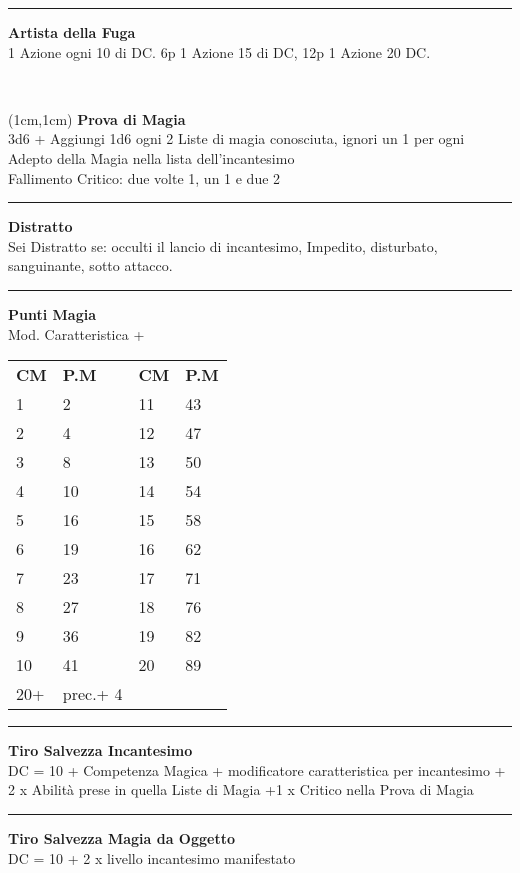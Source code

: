 \documentclass[a4paper,12 pt,openany]{book}
\newcommand{\riga}{\rule{\textwidth}{0.4pt}}
\begin{document}
\begin{textblock*}{7cm}
\riga

\textbf{Artista della Fuga}\\
1 Azione ogni 10 di DC. 6p 1 Azione 15 di DC, 12p 1 Azione 20 DC.

\end{textblock*}

~\newpage

\begin{textblock*}{5cm}(1cm,1cm) %
\textbf{Prova di Magia}\\
3d6 + Aggiungi 1d6 ogni 2 Liste di magia conosciuta, ignori un 1 per ogni Adepto della Magia nella lista dell'incantesimo\\
Fallimento Critico: due volte 1, un 1 e due 2\\


\riga

\textbf{Distratto}\\
Sei Distratto se: occulti il lancio di incantesimo, Impedito, disturbato, sanguinante, sotto attacco.\\

\riga

\textbf{Punti Magia}\\
Mod. Caratteristica + \\

\begin{tabular}{ll|ll}
\textbf{CM} & \textbf{P.M}&	\textbf{CM} & \textbf{P.M}\\
	1&	2 	&11&43\\
2&	4	&12&47\\
3&	8	&13&50\\
4&	10	&14&54\\
5&	16	&15&58\\
6&	19	&16&62\\
7&	23	&17&71\\
8&	27	&18&76\\
9&	36	&19&82\\
10&	41	&20&89\\
20+&prec.+ 4&&\\
\end{tabular}

\riga

\textbf{Tiro Salvezza Incantesimo}\\
DC = 10 + Competenza Magica + modificatore caratteristica per incantesimo + 2 x Abilità prese in quella Liste di Magia +1 x Critico nella Prova di Magia

\riga

\textbf{Tiro Salvezza Magia da Oggetto}\\
DC = 10 + 2 x livello incantesimo manifestato


\end{textblock*}
\end{document}
